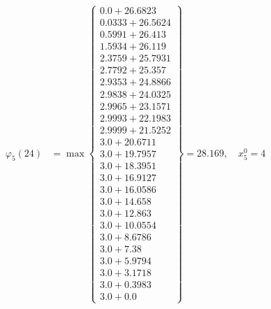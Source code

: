 \documentclass{article}
\begin{document}
\begin{align*}
  
\varphi_{5}(24) &= \max \left\{ \begin{array}{c}
0.0 + 26.6823 \\
 0.0333 + 26.5624 \\
 0.5991 + 26.413 \\
 1.5934 + 26.119 \\
 2.3759 + 25.7931 \\
 2.7792 + 25.357 \\
 2.9353 + 24.8866 \\
 2.9838 + 24.0325 \\
 2.9965 + 23.1571 \\
 2.9993 + 22.1983 \\
 2.9999 + 21.5252 \\
 3.0 + 20.6711 \\
 3.0 + 19.7957 \\
 3.0 + 18.3951 \\
 3.0 + 16.9127 \\
 3.0 + 16.0586 \\
 3.0 + 14.658 \\
 3.0 + 12.863 \\
 3.0 + 10.0554 \\
 3.0 + 8.6786 \\
 3.0 + 7.38 \\
 3.0 + 5.9794 \\
 3.0 + 3.1718 \\
 3.0 + 0.3983 \\
 3.0 + 0.0
\end{array} \right\}=28.169,\quad x_{5}^0=4\\
  
  
  

\end{align*}
\end{document}
